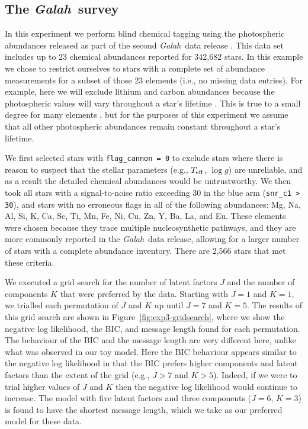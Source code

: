 \documentclass[twocolumn]{aastex62}
\newcommand\teff{T_{\rm eff}}
\newcommand\logg{\log{g}}
\newcommand{\project}[1]{\textsl{#1}}
\newcommand{\Galah}{\project{Galah}}
\newcommand{\NumLatentFactors}{J}
\newcommand{\NumComponents}{K}
\begin{document}
\subsection{The \Galah\ survey}
\label{sec:exp4}

In this experiment we perform blind chemical tagging using the 
photospheric abundances released as part of the second \Galah\ 
data release \citep{Buder:2018}. This data set includes
up to 23 chemical abundances reported for 342,682 stars.
In this example we chose to restrict ourselves to stars with a
complete set of abundance measurements for a subset of those 23 elements
(i.e., no missing data entries).
For example, here we will exclude
lithium and carbon abundances because the
photospheric values will vary throughout a star's lifetime \citep[e.g.,][]{Casey:2016b,Casey:2019}. This is true
to a small degree for many elements \citep[e.g.,][]{Dotter:2017},
but for the purposes of this experiment we assume that all other
photospheric abundances remain constant throughout a star's
lifetime.


We first selected stars with \texttt{flag\_cannon = 0} to exclude
stars where there is reason to suspect that the stellar parameters
(e.g., $\teff$, $\logg$) are unreliable, and as a result the 
detailed chemical abundances would be untrustworthy. We then took all
stars with a signal-to-noise ratio exceeding 30 in the blue arm (\texttt{snr\_c1 > 30}), and
stars with no erroneous flags in all of the following abundances: 
Mg, Na, Al, Si, K, Ca, Sc, Ti, Mn, Fe, Ni, Cu, Zn, Y, Ba, La, and Eu.
These elements were chosen because they trace multiple nucleosynthetic pathways, and they are more commonly reported in the \Galah\ data release, allowing for a larger number of stars with a complete abundance inventory.
There are 2,566 stars that met these criteria. 



We executed a grid search for the number of latent factors $\NumLatentFactors$
and the number of components $\NumComponents$ that were preferred by the data.
Starting with $\NumLatentFactors = 1$ and $\NumComponents = 1$, we trialled each
permutation of $\NumLatentFactors$ and $\NumComponents$ up until $\NumLatentFactors = 7$
and $\NumComponents = 5$. 
The results of this grid search are shown in Figure~\ref{fig:exp3-gridsearch},
where we show the negative log likelihood, the BIC, and message length found for each permutation.
The behaviour of the BIC and the message length are very different here, unlike what was observed
in our toy model. Here the BIC behaviour appears similar to the negative log likelihood in that the BIC
prefers higher components and latent factors than the extent of the grid (e.g., $J > 7$ and $K > 5$). Indeed, if we were to trial higher values of $J$ and $K$ then the negative log likelihood would continue to increase.
The model with five latent factors and three components ($J = 6$, $K = 3$) is found to have the shortest message length, which we take as our preferred model for these data.
\end{document}

